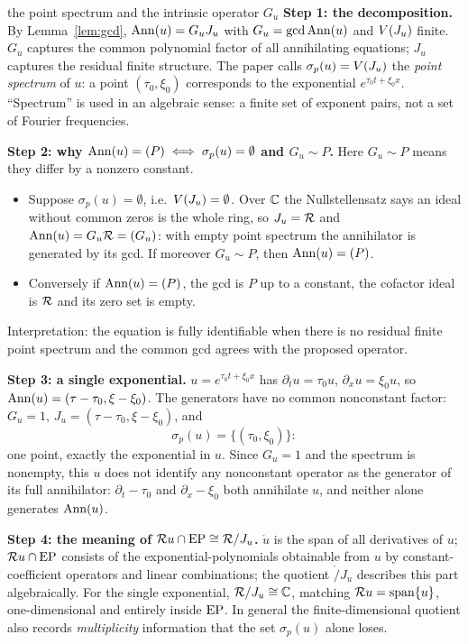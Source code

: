 \begin{explained}{the point spectrum and the intrinsic operator $G_u$}
\textbf{Step 1: the decomposition.} By Lemma~\ref{lem:gcd}, $\operatorname{Ann}(u)=G_uJ_u$ with $G_u=\operatorname{gcd}\operatorname{Ann}(u)$ and $V(J_u)$ finite. $G_u$ captures the common polynomial factor of all annihilating equations; $J_u$ captures the residual finite structure. The paper calls $\sigma_p(u)=V(J_u)$ the \emph{point spectrum} of $u$: a point $(\tau_0,\xi_0)$ corresponds to the exponential $e^{\tau_0t+\xi_0x}$. ``Spectrum'' is used in an algebraic sense: a finite set of exponent pairs, not a set of Fourier frequencies.

\medskip\textbf{Step 2: why $\operatorname{Ann}(u)=(P)\iff\sigma_p(u)=\emptyset$ and $G_u\sim P$.} Here $G_u\sim P$ means they differ by a nonzero constant.
\begin{itemize}[nosep]
\item Suppose $\sigma_p(u)=\emptyset$, i.e.\ $V(J_u)=\emptyset$. Over $\mathbb{C}$ the Nullstellensatz says an ideal without common zeros is the whole ring, so $J_u=\mathcal{R}$ and $\operatorname{Ann}(u)=G_u\mathcal{R}=(G_u)$: with empty point spectrum the annihilator is generated by its gcd. If moreover $G_u\sim P$, then $\operatorname{Ann}(u)=(P)$.
\item Conversely if $\operatorname{Ann}(u)=(P)$, the gcd is $P$ up to a constant, the cofactor ideal is $\mathcal{R}$ and its zero set is empty.
\end{itemize}
Interpretation: the equation is fully identifiable when there is no residual finite point spectrum and the common gcd agrees with the proposed operator.

\medskip\textbf{Step 3: a single exponential.} $u=e^{\tau_0t+\xi_0x}$ has $\partial_tu=\tau_0u$, $\partial_xu=\xi_0u$, so $\operatorname{Ann}(u)=(\tau-\tau_0,\xi-\xi_0)$. The generators have no common nonconstant factor: $G_u=1$, $J_u=(\tau-\tau_0,\xi-\xi_0)$, and
\[
\sigma_p(u)=\{(\tau_0,\xi_0)\}:
\]
one point, exactly the exponential in $u$. Since $G_u=1$ and the spectrum is nonempty, this $u$ does not identify any nonconstant operator as the generator of its full annihilator: $\partial_t-\tau_0$ and $\partial_x-\xi_0$ both annihilate $u$, and neither alone generates $\operatorname{Ann}(u)$.

\medskip\textbf{Step 4: the meaning of $\mathcal{R} u\cap\mathrm{EP}\cong\mathcal{R}/J_u$.} $\ring u$ is the span of all derivatives of $u$; $\mathcal{R} u\cap\mathrm{EP}$ consists of the exponential-polynomials obtainable from $u$ by constant-coefficient operators and linear combinations; the quotient $\ring/J_u$ describes this part algebraically. For the single exponential, $\mathcal{R}/J_u\cong\mathbb{C}$, matching $\mathcal{R} u=\operatorname{span}\{u\}$, one-dimensional and entirely inside $\mathrm{EP}$. In general the finite-dimensional quotient also records \emph{multiplicity} information that the set $\sigma_p(u)$ alone loses.


\end{explained}
